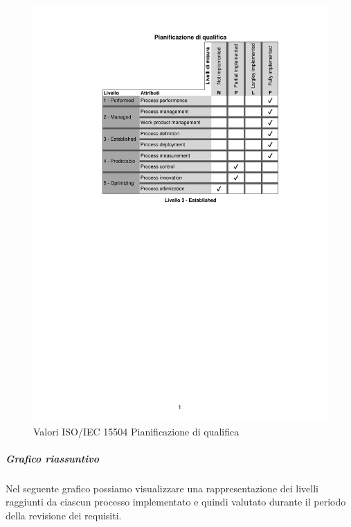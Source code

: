 \begin{figure}[H]
	\centering
	\includegraphics[scale=1]{images/resoconto/RR/pianificazionequalifica-RR.pdf}
	\caption{Valori ISO/IEC 15504 Pianificazione di qualifica}	
\end{figure}
\newpage

\subparagraph{Grafico riassuntivo}
Nel seguente grafico possiamo visualizzare una rappresentazione dei livelli raggiunti da ciascun processo implementato e quindi valutato durante il periodo della revisione dei requisiti. 


